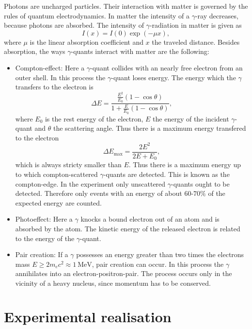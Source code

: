 Photons are uncharged particles. Their interaction with matter is governed by the rules of quantum electrodynamics. In matter the intensity of a $\gamma$-ray decreases, because photons are absorbed. The intensity of $\gamma$-radiation in matter is given as
\begin{equation}
 I(x) = I(0) \exp\left(-\mu x\right),
\end{equation}
where $\mu$ is the linear absorption coefficient and $x$ the traveled distance. Besides absorption, the ways $\gamma$-quants interact with matter are the following:
\begin{itemize}
 \item Compton-effect: Here a $\gamma$-quant collides with an nearly free electron from an outer shell. In this process the $\gamma$-quant loses energy. The energy which the $\gamma$ transfers to the electron is \cite{BB}
	\begin{equation}
	  \Delta E = \frac{\frac{E^{2}}{E_{0}}\left(1-\cos\theta\right)}{1+\frac{E}{E_{0}}\left(1-\cos\theta\right)},
	\end{equation}
	where $E_{0}$ is the rest energy of the electron, $E$ the energy of the incident $\gamma$-quant and $\theta$ the scattering angle. Thus there is a maximum energy transfered to the electron
	\begin{equation}
	 \Delta E_{\textrm{max}} = \frac{2E^{2}}{2E+E_{0}},
	\end{equation}
	which is always stricty smaller than $E$. Thus there is a maximum energy up to which compton-scattered $\gamma$-quants are detected. This is known as the compton-edge. In the experiment only unscattered $\gamma$-quants ought to be detected. Therefore only events with an energy of about $60$-$70\%$ of the expected energy are counted.
 \item Photoeffect: Here a $\gamma$ knocks a bound electron out of an atom and is absorbed by the atom. The kinetic energy of the released electron is related to the energy of the $\gamma$-quant.
 \item Pair creation: If a $\gamma$ possesses an energy greater than two times the electrons mass $E\geq2m_{e}c^{2}\approx\SI{1}{\mega\electronvolt}$, pair creation can occur. In this process the $\gamma$ annihilates into an electron-positron-pair. The process occurs only in the vicinity of a heavy nucleus, since momentum has to be conserved.
\end{itemize}


\section{Experimental realisation}

